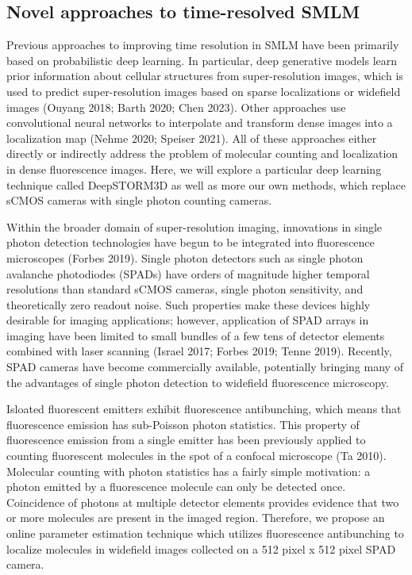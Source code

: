 \documentclass{ucetd}
\begin{document}
\subsection{Novel approaches to time-resolved SMLM}

Previous approaches to improving time resolution in SMLM have been primarily based on probabilistic deep learning. In particular, deep generative models learn prior information about cellular structures from super-resolution images, which is used to predict super-resolution images based on sparse localizations or widefield images (Ouyang 2018; Barth 2020; Chen 2023). Other approaches use convolutional neural networks to interpolate and transform dense images into a localization map (Nehme 2020; Speiser 2021). All of these approaches either directly or indirectly address the problem of molecular counting and localization in dense fluorescence images. Here, we will explore a particular deep learning technique called DeepSTORM3D as well as more our own methods, which replace sCMOS cameras with single photon counting cameras. 

Within the broader domain of super-resolution imaging, innovations in single photon detection technologies have begun to be integrated into fluorescence microscopes (Forbes 2019). Single photon detectors such as single photon avalanche photodiodes (SPADs) have orders of magnitude higher temporal resolutions than standard sCMOS cameras, single photon sensitivity, and theoretically zero readout noise. Such properties make these devices highly desirable for imaging applications; however, application of SPAD arrays in imaging have been limited to small bundles of a few tens of detector elements combined with laser scanning (Israel 2017; Forbes 2019; Tenne 2019). Recently, SPAD cameras have become commercially available, potentially bringing many of the advantages of single photon detection to widefield fluorescence microscopy. 

Isloated fluorescent emitters exhibit fluorescence antibunching, which means that fluorescence emission has sub-Poisson photon statistics. This property of fluorescence emission from a single emitter has been previously applied to counting fluorescent molecules in the spot of a confocal microscope (Ta 2010). Molecular counting with photon statistics has a fairly simple motivation: a photon emitted by a fluorescence molecule can only be detected once. Coincidence of photons at multiple detector elements provides evidence that two or more molecules are present in the imaged region. Therefore, we propose an online parameter estimation technique which utilizes fluorescence antibunching to localize molecules in widefield images collected on a 512 pixel x 512 pixel SPAD camera.
\end{document}
